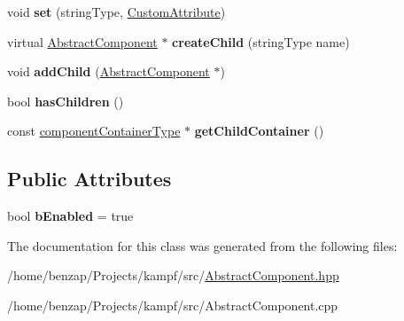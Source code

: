 \begin{DoxyCompactItemize}
\item 
\hypertarget{classAbstractComponent_a6a2eb279a4fc5629b35bbacdc793c50f}{void {\bfseries set} (string\-Type, \hyperlink{classCustomAttribute}{Custom\-Attribute})}\label{classAbstractComponent_a6a2eb279a4fc5629b35bbacdc793c50f}

\item 
\hypertarget{classAbstractComponent_a36260e2202cb7e7016ef565d06bf4369}{virtual \hyperlink{classAbstractComponent}{Abstract\-Component} $\ast$ {\bfseries create\-Child} (string\-Type name)}\label{classAbstractComponent_a36260e2202cb7e7016ef565d06bf4369}

\item 
\hypertarget{classAbstractComponent_a82d5722f60d112a037af6a7ee83685e4}{void {\bfseries add\-Child} (\hyperlink{classAbstractComponent}{Abstract\-Component} $\ast$)}\label{classAbstractComponent_a82d5722f60d112a037af6a7ee83685e4}

\item 
\hypertarget{classAbstractComponent_a00b57dab3f0ca97f1c0a50870f2337aa}{bool {\bfseries has\-Children} ()}\label{classAbstractComponent_a00b57dab3f0ca97f1c0a50870f2337aa}

\item 
\hypertarget{classAbstractComponent_ac86b8c7a616f3b8873b23ee6f5e5ae28}{const \hyperlink{AbstractComponent_8hpp_a2422f907615dc397bb0347b2543f54d4}{component\-Container\-Type} $\ast$ {\bfseries get\-Child\-Container} ()}\label{classAbstractComponent_ac86b8c7a616f3b8873b23ee6f5e5ae28}

\end{DoxyCompactItemize}
\subsection*{Public Attributes}
\begin{DoxyCompactItemize}
\item 
\hypertarget{classAbstractComponent_a4772ce2d2776817b00702f58bfc0d7c8}{bool {\bfseries b\-Enabled} = true}\label{classAbstractComponent_a4772ce2d2776817b00702f58bfc0d7c8}

\end{DoxyCompactItemize}


The documentation for this class was generated from the following files\-:\begin{DoxyCompactItemize}
\item 
/home/benzap/\-Projects/kampf/src/\hyperlink{AbstractComponent_8hpp}{Abstract\-Component.\-hpp}\item 
/home/benzap/\-Projects/kampf/src/Abstract\-Component.\-cpp\end{DoxyCompactItemize}
